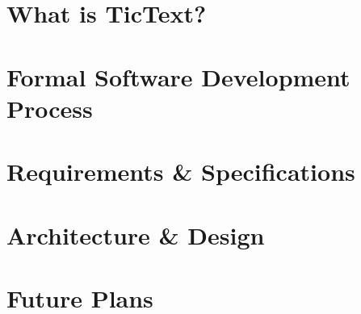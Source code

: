 \documentclass[11pt, titlepage]{article} %
\begin{document}
\section{What is TicText?}


\clearpage
\section{Formal Software Development Process}


\clearpage
\section{Requirements \& Specifications}


\clearpage
\section{Architecture \& Design}


\clearpage
\section{Future Plans}

\end{document}
